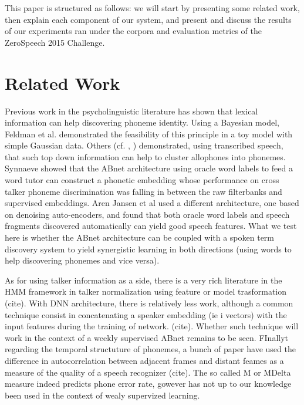 \documentclass[a4paper]{article}
\begin{document}
This paper is structured as follows: we will start by presenting some related work, then explain each component of our system, and present and discuss the results of our experiments ran under the corpora and evaluation metrics of the ZeroSpeech 2015 Challenge.\cite{versteeghetal2015}

\section{Related Work}
Previous work in the psycholinguistic literature has shown that lexical information can help discovering phoneme identity. Using a Bayesian model, Feldman et al.\cite{feldmanetal2013} demonstrated the feasibility of this principle in a toy model with simple Gaussian data. Others (cf. \cite{martinetalinpress}, \cite{fourtassietal2014}) demonstrated, using transcribed speech, that such top down information can help to cluster allophones into phonemes. Synnaeve \cite{synnaeve&dupoux2014} showed that the ABnet architecture using oracle word labels to feed a word tutor can construct a phonetic embedding whose performance on cross talker phoneme discrimination was falling in between the raw filterbanks and supervised embeddings. Aren Jansen et al used a different architecture, one based on denoising auto-encoders, and found that both oracle word labels and speech fragments discovered automatically can yield good speech features.  What we test here is whether the ABnet architecture can be coupled with a spoken term discovery system to yield synergistic learning in both directions (using words to help discovering phonemes and vice versa).

As for using talker information as a side, there is a very rich literature in the HMM framework in talker normalization using feature or model trasformation (cite). With DNN architecture, there is relatively less work, although a common technique consist in concatenating a speaker embedding (ie i vectors) with the input features during the training of network. (cite). Whether such technique will work in the context of a weekly supervised ABnet remains to be seen. FInallyt regarding the temporal structuture of phonemes, a bunch of paper have used the difference in autocorrelation between adjacent frames and distant feames as a measure of the quality of a speech recognizer (cite). The so called M or MDelta measure indeed predicts phone error rate, gowever has not up to our knowledge been used in the context of wealy supervized learning.
\end{document}
